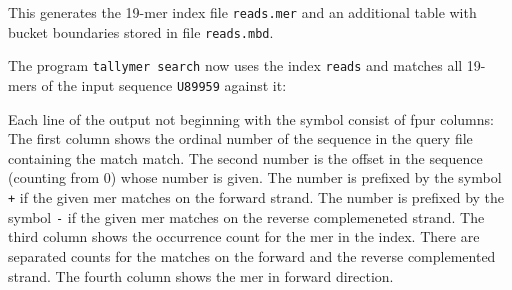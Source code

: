 \documentclass[12pt]{article}
\newcommand{\Programname}[1]{\texttt{#1}}
\newcommand{\TYsearch}[0]{\Programname{tallymer search}\xspace}
\begin{document}

This generates the 19-mer index file \texttt{reads.mer} and an additional
table with bucket boundaries stored in file \texttt{reads.mbd}.

The program \TYsearch now uses the index \texttt{reads} and
matches all 19-mers of the input sequence \texttt{U89959} against it:


Each line of the output not beginning with the symbol \texttt{}
consist of fpur columns: The first column shows the ordinal number of the
sequence in the query file containing the match match. The second number
is the offset in the sequence (counting from 0) whose number is given.
The number is prefixed by the symbol \texttt{+} if the given mer
matches on the forward strand.
The number is prefixed by the symbol \texttt{-} if the given mer
matches on the reverse complemeneted strand. The third column shows
the occurrence count for the mer in the index. There are separated 
counts for the matches on the forward and the reverse complemented strand.
The fourth column shows the mer in forward direction. 


\end{document}
